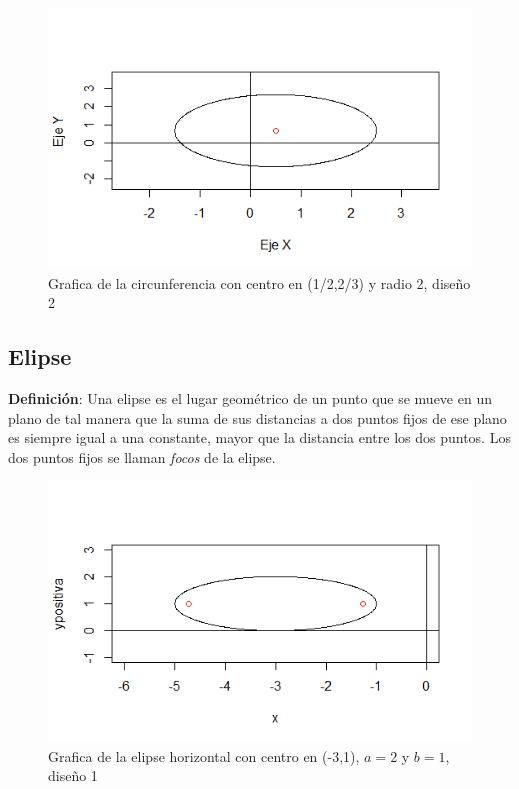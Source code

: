 \documentclass[12pt,a4paper]{article} %
\begin{document}
\begin{figure}
\centering
\includegraphics[scale=0.75]{Circunfe3.png}
\caption{Grafica de la circunferencia con centro en (1/2,2/3) y radio 2, diseño 2}
\end{figure}

\newpage
\subsection{Elipse}

\textbf{Definici\'{o}n}: Una elipse es el lugar geométrico de un punto que se mueve en un plano de tal manera que la suma de sus distancias a dos puntos fijos de ese plano es siempre igual a una constante, mayor que la distancia entre los dos puntos. Los dos puntos fijos se llaman \textit{focos} de la elipse. 

\begin{figure}
\centering
\includegraphics[scale=0.75]{Elipse2.png}
\caption{Grafica de la elipse horizontal con centro en (-3,1), $a = 2$ y $b = 1$, diseño 1}
\end{figure}
\end{document}
